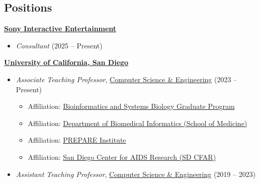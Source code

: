\documentclass[margin,line]{res}
\begin{document}
\begin{resume}

\section{\sc Positions}
{\bf \href{https://sonyinteractive.com/}{Sony Interactive Entertainment}}\\
\vspace*{-.1in}
\begin{itemize}
\item[] \hspace*{-2mm} \textit{Consultant} (2025 -- Present)
\end{itemize}
{\bf \href{http://www.ucsd.edu/}{University of California, San Diego}}\\
\vspace*{-.1in}
\begin{itemize}
\item[] \hspace*{-2mm} \textit{Associate Teaching Professor}, \href{http://www.cs.ucsd.edu/}{Computer Science \& Engineering} (2023 -- Present)
\begin{itemize}
\item Affiliation: \href{http://bioinformatics.ucsd.edu/}{Bioinformatics and Systems Biology Graduate Program}
\item Affiliation: \href{http://dbmi.ucsd.edu/}{Department of Biomedical Informatics (School of Medicine)}
\item Affiliation: \href{https://prepare.ucsd.edu/}{PREPARE Institute}
\item Affiliation: \href{https://cfar.ucsd.edu/}{San Diego Center for AIDS Research (SD CFAR)}
\end{itemize}
\item[] \hspace*{-2mm} \textit{Assistant Teaching Professor}, \href{http://www.cs.ucsd.edu/}{Computer Science \& Engineering} (2019 -- 2023)
\end{itemize}


\end{resume}
\end{document}
